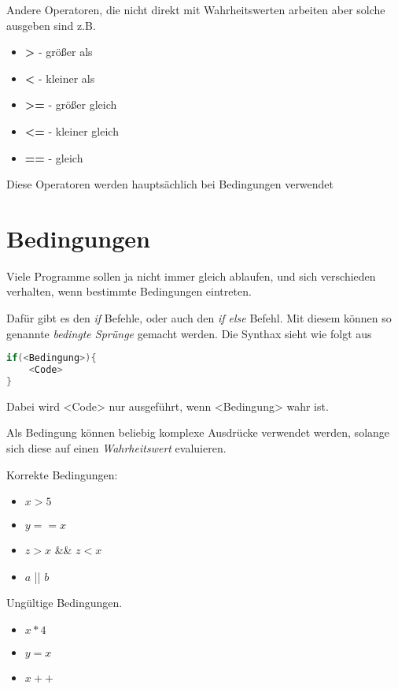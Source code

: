 \documentclass[c_worksheet.tex]{subfiles}
\begin{document}
Andere Operatoren, die nicht direkt mit Wahrheitswerten arbeiten aber solche ausgeben sind z.B.

\begin{itemize}
	\item \textbf{>} - größer als
	\item \textbf{<} - kleiner als
	\item \textbf{>=} - größer gleich
	\item \textbf{<=} - kleiner gleich
	\item \textbf{==} - gleich
\end{itemize}

Diese Operatoren werden hauptsächlich bei Bedingungen verwendet

\section{Bedingungen}

Viele Programme sollen ja nicht immer gleich ablaufen, und sich verschieden verhalten, wenn bestimmte Bedingungen eintreten.

Dafür gibt es den \emph{if} Befehle, oder auch den \emph{if else} Befehl. Mit diesem können so genannte \emph{bedingte Sprünge} gemacht werden. Die Synthax sieht wie folgt aus

\begin{lstlisting}[language=c]
if(<Bedingung>){
	<Code>
}
\end{lstlisting}

Dabei wird <Code> nur ausgeführt, wenn <Bedingung> wahr ist.

Als Bedingung können beliebig komplexe Ausdrücke verwendet werden, solange sich diese auf einen \emph{Wahrheitswert} evaluieren.

Korrekte Bedingungen:

\begin{itemize}
	\item \(x > 5\)
	\item \(y == x\)
	\item \(z > x\) \&\& \(z < x\)
	\item \(a\) || \(b\)
\end{itemize}

Ungültige Bedingungen.

\begin{itemize}
	\item \(x * 4\)
	\item \(y = x\)
	\item \(x++\)
\end{itemize}
\end{document}
